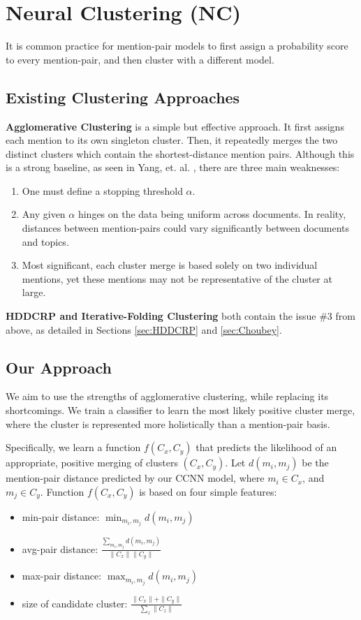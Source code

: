 \documentclass[11pt,a4paper]{article}
\begin{document}
\section{Neural Clustering (NC)}
\label{sec:clustering}
It is common practice for mention-pair models to first assign a probability score to every mention-pair, and then cluster with a different model.

\subsection{Existing Clustering Approaches}
\textbf{Agglomerative Clustering} is a simple but effective approach.  It first assigns each mention to its own singleton cluster.  Then, it repeatedly merges the two distinct clusters which contain the shortest-distance mention pairs.  Although this is a strong baseline, as seen in Yang, et. al. , there are three main weaknesses:
\begin{enumerate}
\item One must define a stopping threshold $\alpha$.
\item Any given $\alpha$ hinges on the data being uniform across documents.  In reality, distances between mention-pairs could vary significantly between documents and topics.
\item Most significant, each cluster merge is based solely on two individual mentions, yet these mentions may not be representative of the cluster at large.
\end{enumerate}

\textbf{HDDCRP and Iterative-Folding Clustering} both contain the issue \#3 from above, as detailed in Sections \ref{sec:HDDCRP} and \ref{sec:Choubey}.

\subsection{Our Approach}
We aim to use the strengths of agglomerative clustering, while replacing its shortcomings.  We train a classifier to learn the most likely {positive cluster merge}, where the cluster is represented more holistically than a mention-pair basis.

Specifically, we learn a function $f(C_x,C_y)$ that predicts the likelihood of an appropriate, positive merging of clusters $(C_x,C_y)$. Let $d(m_i,m_j)$ be the mention-pair distance predicted by our CCNN model, where $m_i \in C_x$, and $m_j \in C_y$.  Function $f(C_x,C_y)$ is based on four simple features:
\begin{itemize}
  \item min-pair distance: $\min_{m_i,m_j} d(m_i,m_j)$
  \item avg-pair distance: $\frac{\sum_{m_i, m_j} d(m_i,m_j)}{\|C_x\|\|C_y\|}$
  \item max-pair distance: $\max_{m_i,m_j} d(m_i,m_j)$
  \item size of candidate cluster: $\frac{\|C_x\| + \|C_y\|}{\sum_{z}{\|C_z\|}}$
\end{itemize}
\end{document}
